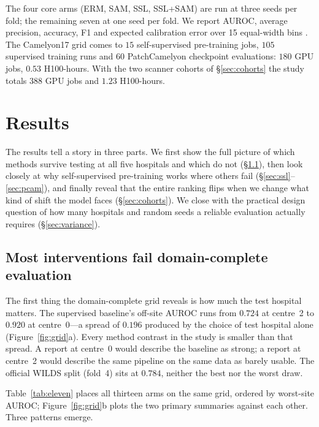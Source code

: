 \documentclass[10pt]{article} %
\begin{document}
The four core arms (ERM, SAM, SSL, SSL+SAM) are run at three seeds per fold;
the remaining seven at one seed per fold. We report AUROC, average precision,
accuracy, F1 and expected calibration error over 15 equal-width bins
\citep{naeini2015ece,guo2017calibration}. The Camelyon17 grid comes to $15$
self-supervised pre-training jobs, $105$ supervised training runs and $60$
PatchCamelyon checkpoint evaluations: $180$ GPU jobs, $0.53$ H100-hours. With
the two scanner cohorts of \S\ref{sec:cohorts} the study totals $388$ GPU jobs
and $1.23$ H100-hours.

\section{Results}

The results tell a story in three parts. We first show the full picture of
which methods survive testing at all five hospitals and which do not
(\S\ref{sec:eleven}), then look closely at why self-supervised pre-training
works where others fail (\S\ref{sec:ssl}--\ref{sec:pcam}), and finally reveal
that the entire ranking flips when we change what kind of shift the model
faces (\S\ref{sec:cohorts}). We close with the practical design question of
how many hospitals and random seeds a reliable evaluation actually requires
(\S\ref{sec:variance}).

\subsection{Most interventions fail domain-complete evaluation}
\label{sec:eleven}

The first thing the domain-complete grid reveals is how much the test hospital
matters. The supervised baseline's off-site AUROC runs from $0.724$ at
centre~2 to $0.920$ at centre~0---a spread of $0.196$ produced by the choice
of test hospital alone (Figure~\ref{fig:grid}a). Every method contrast in the
study is smaller than that spread. A report at centre~0 would describe the
baseline as strong; a report at centre~2 would describe the same pipeline on
the same data as barely usable. The official WILDS split (fold~4) sits at
$0.784$, neither the best nor the worst draw.

Table~\ref{tab:eleven} places all thirteen arms on the same grid, ordered by
worst-site AUROC; Figure~\ref{fig:grid}b plots the two primary summaries
against each other. Three patterns emerge.
\end{document}
